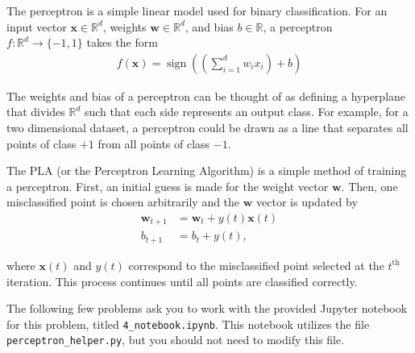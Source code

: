 The perceptron is a simple linear model used for binary classification. For an input vector $\mathbf{x} \in \mathbb{R}^d$, weights $\mathbf{w} \in \mathbb{R}^d$, and bias $b \in \mathbb{R}$, a perceptron $f: \mathbb{R}^d \rightarrow \{-1,1\}$ takes the form
\begin{align*}
  f(\mathbf{x}) = \operatorname{sign}\left(\left(\sum_{i=1}^d w_i x_i\right) + b \right)
\end{align*}

The weights and bias of a perceptron can be thought of as defining a hyperplane that divides $\mathbb{R}^d$ such that each side represents an output class. For example, for a two dimensional dataset, a perceptron could be drawn as a line that separates all points of class $+1$ from all points of class $-1$.

The PLA (or the Perceptron Learning Algorithm) is a simple method of training a perceptron. First, an initial guess is made for the weight vector $\mathbf{w}$. Then, one misclassified point is chosen arbitrarily and the $\mathbf{w}$ vector is updated by
\begin{align*}
  \mathbf{w}_{t+1} &= \mathbf{w}_t + y(t)\mathbf{x}(t) \\
  b_{t + 1} &= b_t + y(t),
\end{align*}

where $\mathbf{x}(t)$ and $y(t)$ correspond to the misclassified point selected at the $t^\text{th}$ iteration.
This process continues until all points are classified correctly.

The following few problems ask you to work with the provided Jupyter notebook for this problem, titled \texttt{4_notebook.ipynb}. This notebook utilizes the file \texttt{perceptron_helper.py}, but you should not need to modify this file.


